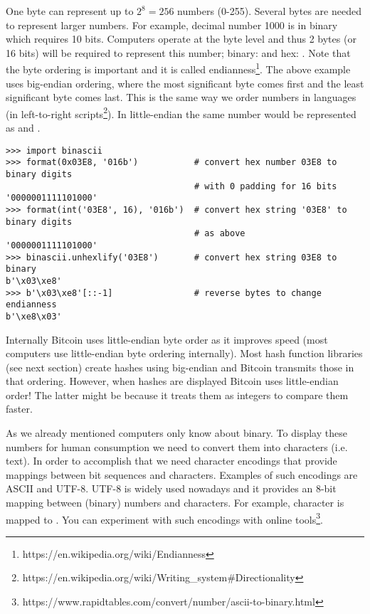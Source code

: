 One byte can represent up to $2^8=256$ numbers (0-255). Several bytes are needed to represent larger numbers. For example, decimal number 1000 is  in binary which requires 10 bits. Computers operate at the byte level and thus 2 bytes (or 16 bits) will be required to represent this number; binary:  and hex: . Note that the byte ordering is important and it is called endianness\footnote{https://en.wikipedia.org/wiki/Endianness}. The above example uses big-endian ordering, where the most significant byte comes first and the least significant byte comes last. This is the same way we order numbers in languages (in left-to-right scripts\footnote{https://en.wikipedia.org/wiki/Writing\_system\#Directionality}). In little-endian the same number would be represented as  and .

\vspace{1em}
\begin{lstlisting}[style=Python,label={lst:encodings-2},caption={Python examples},captionpos=b]
>>> import binascii
>>> format(0x03E8, '016b')           # convert hex number 03E8 to binary digits
                                     # with 0 padding for 16 bits
'0000001111101000'
>>> format(int('03E8', 16), '016b')  # convert hex string '03E8' to binary digits 
                                     # as above
'0000001111101000'
>>> binascii.unhexlify('03E8')       # convert hex string 03E8 to binary
b'\x03\xe8'
>>> b'\x03\xe8'[::-1]                # reverse bytes to change endianness
b'\xe8\x03'
\end{lstlisting}
\vspace{1em}


\begin{note}
Internally Bitcoin uses little-endian byte order as it improves speed (most computers use little-endian byte ordering internally). Most hash function libraries (see next section) create hashes using big-endian and Bitcoin transmits those in that ordering. However, when hashes are displayed Bitcoin uses little-endian order! The latter might be because it treats them as integers to compare them faster.
\end{note}

As we already mentioned computers only know about binary. To display these numbers for human consumption we need to convert them into characters (i.e. text). In order to accomplish that we need character encodings that provide mappings between bit sequences and characters. Examples of such encodings are ASCII and UTF-8. UTF-8 is widely used nowadays and it provides an 8-bit mapping between (binary) numbers and characters. For example, character  is mapped to . You can experiment with such encodings with online tools\footnote{https://www.rapidtables.com/convert/number/ascii-to-binary.html}.

